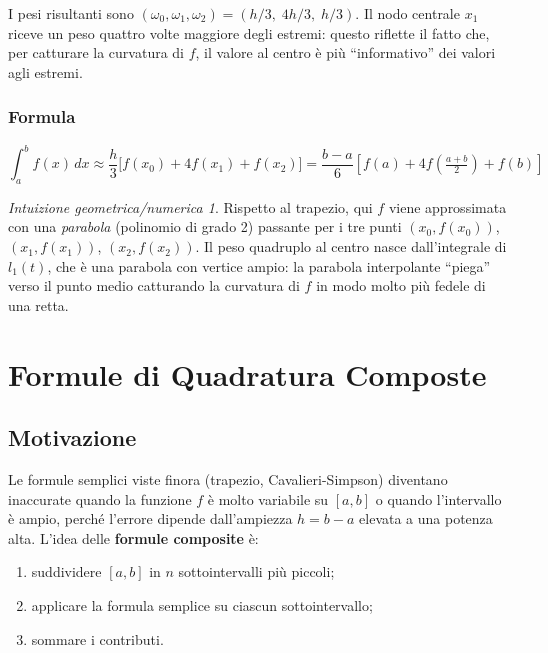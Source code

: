 \documentclass[a4paper,12pt]{article}
\theoremstyle{definition}
\theoremstyle{remark}
\newtheorem*{intuizione}{Intuizione geometrica/numerica}
\begin{document}
\noindent I pesi risultanti sono $(\omega_0,\omega_1,\omega_2) =
(h/3,\; 4h/3,\; h/3)$.
Il nodo centrale $x_1$ riceve un peso quattro volte maggiore degli
estremi: questo riflette il fatto che, per catturare la curvatura di
$f$, il valore al centro è più ``informativo'' dei valori agli estremi.

\subsubsection*{Formula}

\begin{equation}
  \boxed{
    \int_a^b f(x)\,dx
    \approx \frac{h}{3}\bigl[f(x_0) + 4f(x_1) + f(x_2)\bigr]
    = \frac{b-a}{6}\left[f(a) + 4f\!\left(\tfrac{a+b}{2}\right) + f(b)\right]
  }
  \label{eq:simpson}
\end{equation}

\begin{intuizione}
Rispetto al trapezio, qui $f$ viene approssimata con una \emph{parabola}
(polinomio di grado 2) passante per i tre punti
$(x_0,f(x_0))$, $(x_1,f(x_1))$, $(x_2,f(x_2))$.
Il peso quadruplo al centro nasce dall'integrale di $l_1(t)$, che è
una parabola con vertice ampio: la parabola interpolante ``piega'' verso
il punto medio catturando la curvatura di $f$ in modo molto più fedele
di una retta.
\end{intuizione}

\section{Formule di Quadratura Composte}

\subsection{Motivazione}

Le formule semplici viste finora (trapezio, Cavalieri-Simpson) diventano
inaccurate quando la funzione $f$ è molto variabile su $[a,b]$ o quando
l'intervallo è ampio, perché l'errore dipende dall'ampiezza $h = b - a$
elevata a una potenza alta.
L'idea delle \textbf{formule composite} è:
\begin{enumerate}
  \item suddividere $[a,b]$ in $n$ sottointervalli più piccoli;
  \item applicare la formula semplice su ciascun sottointervallo;
  \item sommare i contributi.
\end{enumerate}
\end{document}
